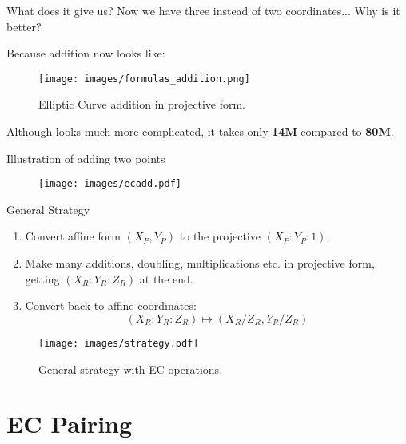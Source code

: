 \documentclass[xcolor={usenames,dvipsnames}]{beamer}
\begin{document}
    \begin{frame}{What does it give us?}
        Now we have three instead of two coordinates... Why is it better?

        Because addition now looks like:
        
        \begin{figure}
            \centering
            \texttt{[image: images/formulas\_addition.png]}
            \caption{Elliptic Curve addition in projective form.}
        \end{figure}

        Although looks much more complicated, it takes only \textbf{14M} compared to \textbf{80M}.
    \end{frame}

    \begin{frame}{Illustration of adding two points}	
        \begin{figure}
            \centering
            \texttt{[image: images/ecadd.pdf]}
        \end{figure}
    \end{frame}

    \begin{frame}{General Strategy}
        \begin{enumerate}
            \item Convert affine form $(X_P,Y_P)$ to the projective $(X_P:Y_P:1)$.
            \item Make many additions, doubling, multiplications etc. in projective form, getting $(X_R:Y_R:Z_R)$ at the end.
            \item Convert back to affine coordinates:
            \begin{equation*}
                (X_R:Y_R:Z_R) \mapsto (X_R/Z_R,Y_R/Z_R)
            \end{equation*}
        \end{enumerate}

        \begin{figure}
            \centering
            \texttt{[image: images/strategy.pdf]}
            \caption{General strategy with EC operations.}
        \end{figure}
    \end{frame}

    \section{EC Pairing}
\end{document}
